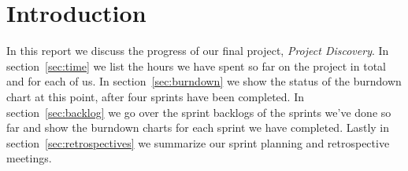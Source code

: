 \section{Introduction}\label{sec:introduction}

In this report we discuss the progress of our final project, \emph{Project Discovery}. In section~\ref{sec:time} we list the hours we have spent so far on the project in total and for each of us. In section~\ref{sec:burndown} we show the status of the burndown chart at this point, after four sprints have been completed. In section~\ref{sec:backlog} we go over the sprint backlogs of the sprints we've done so far and show the burndown charts for each sprint we have completed. Lastly in section~\ref{sec:retrospectives} we summarize our sprint planning and retrospective meetings. 